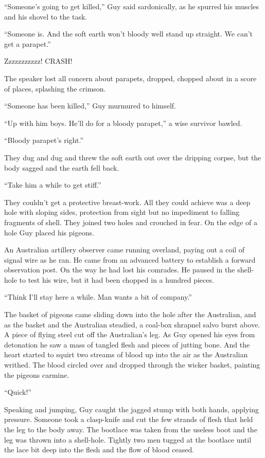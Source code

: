 ``Someone's going to get killed,'' Guy said sardonically, as he spurred his muscles and his shovel to the task.

``Someone is. And the soft earth won't bloody well stand up straight. We can't get a parapet.''

Zzzzzzzzzzz! CRASH!

The speaker lost all concern about parapets, dropped, chopped about in a score of places, splashing the crimson.

``Someone has been killed,'' Guy murmured to himself.

``Up with him boys. He'll do for a bloody parapet,'' a wise survivor bawled.

``Bloody parapet's right.''

They dug and dug and threw the soft earth out over the dripping corpse, but the body sagged and the earth fell back.

``Take him a while to get stiff.''

They couldn't get a protective breast-work. All they could achieve was a deep hole with sloping sides, protection from sight but no impediment to falling fragments of shell. They joined two holes and crouched in fear. On the edge of a hole Guy placed his pigeons.

An Australian artillery observer came running overland, paying out a coil of signal wire as he ran. He came from an advanced battery to establish a forward observation post. On the way he had lost his comrades. He paused in the shell-hole to test his wire, but it had been chopped in a hundred pieces.

``Think I'll stay here a while. Man wants a bit of company.''

The basket of pigeons came sliding down into the hole after the Australian, and as the basket and the Australian steadied, a coal-box shrapnel salvo burst above. A piece of flying steel cut off the Australian's leg. As Guy opened his eyes from detonation he saw a mass of tangled flesh and pieces of jutting bone. And the heart started to squirt two streams of blood up into the air as the Australian writhed. The blood circled over and dropped through the wicker basket, painting the pigeons carmine.

``Quick!''

Speaking and jumping, Guy caught the jagged stump with both hands, applying pressure. Someone took a clasp-knife and cut the few strands of flesh that held the leg to the body away. The bootlace was taken from the useless boot and the leg was thrown into a shell-hole. Tightly two men tugged at the bootlace until the lace bit deep into the flesh and the flow of blood ceased.

